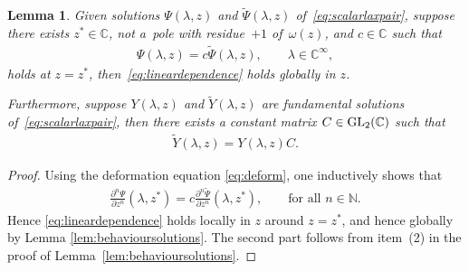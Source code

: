 \documentclass[pdftex]{sigma}
\numberwithin{equation}{section}
\newtheorem{lem}[thm]{Lemma}
\newcommand{\om}{\omega}
\begin{document}
\begin{lem}\label{lem:lineardeplocalglobal}
Given solutions $\Psi(\lambda,z)$ and $\widetilde{\Psi}(\lambda,z)$ of~\eqref{eq:scalarlaxpair}, suppose there exists $z^*\in\mathbb{C}$, not a~pole with residue~$+1$ of~$\om(z)$, and $c\in\mathbb{C}$ such that
	\begin{gather}\label{eq:lineardependence}
	\Psi(\lambda,z)=c\widetilde{\Psi}(\lambda,z),\qquad \lambda\in\mathbb{C}^\infty,
	\end{gather}
	holds at $z=z^*$, then~\eqref{eq:lineardependence} holds globally in $z$.

 Furthermore, suppose $Y(\lambda,z)$ and $\widetilde{Y}(\lambda,z)$ are fundamental solutions of~\eqref{eq:scalarlaxpair}, then there exists a constant matrix $C\in {\rm GL}_2(\mathbb{C})$ such that
	\begin{gather}\label{eq:connectionmatrix}
	\widetilde{Y}(\lambda,z)=Y(\lambda,z)C.
	\end{gather}
\end{lem}
\begin{proof}
	Using the deformation equation \eqref{eq:deform}, one inductively shows that
\begin{gather*}
\frac{\partial^n\Psi}{\partial z^n}(\lambda,z^*)=c \frac{\partial^n\widetilde{\Psi}}{\partial z^n}(\lambda,z^*), \qquad \text{for all $n\in\mathbb{N}$}.
\end{gather*} Hence \eqref{eq:lineardependence} holds locally in $z$ around $z=z^*$, and hence globally by Lemma \ref{lem:behavioursolutions}.
	The second part follows from item~(2) in the proof of Lemma~\ref{lem:behavioursolutions}.
\end{proof}
\end{document}
